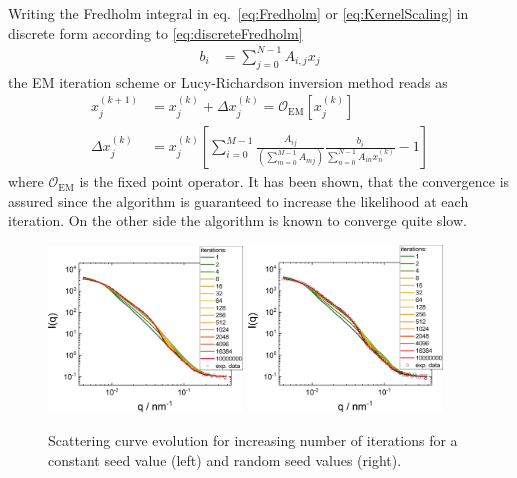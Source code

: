 Writing the Fredholm integral in eq.\ \ref{eq:Fredholm} or \ref{eq:KernelScaling} in discrete form according to \ref{eq:discreteFredholm}
\begin{align}
b_i &= \sum_{j=0}^{N-1} A_{i,j} x_j
\end{align}
the EM iteration scheme or Lucy\hyp{}Richardson inversion method reads as
\begin{align}\label{eq:LucyRichardsonInversionMethod}
  x_j^{(k+1)} &= x_j^{(k)} + \Delta x_j^{(k)} = \mathcal{O}_\mathrm{EM}\left[x_j^{(k)}\right]\\
  \Delta x_j^{(k)} &= x_j^{(k)}\left[\sum_{i=0}^{M-1}\frac{A_{ij}}{\left(\displaystyle \sum_{m=0}^{M-1}A_{mj}\right)}\frac{b_i}{\displaystyle \sum_{n=0}^{N-1}A_{in}x_n^{(k)}}-1\right]
\end{align}
where $\mathcal{O}_\mathrm{EM}$ is the fixed point operator. It has been shown, that the convergence is assured since the algorithm is guaranteed to increase the likelihood at each iteration. On the other side the algorithm is known to converge quite slow.


\begin{figure}[htb]
\centering
\includegraphics[width=0.46\textwidth]{../images/form_factor/EM/EMconstant_seed_smooth_0_0_IQ.png}
\hspace{0.06\textwidth}
\includegraphics[width=0.46\textwidth]{../images/form_factor/EM/EMrandom_seed_smooth_0_0_IQ.png}
\caption{Scattering curve evolution for increasing number of iterations for a constant seed value (left) and random seed values (right).\label{fig:EMIQevolution}}
\end{figure}


